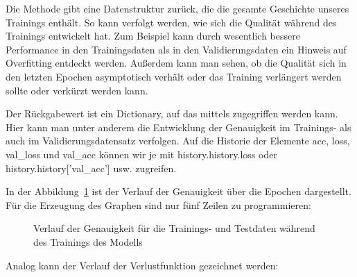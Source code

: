 Die Methode  gibt eine Datenstruktur zurück, die die gesamte Geschichte unseres Trainings enthält. So kann verfolgt werden, wie sich die Qualität während des Trainings entwickelt hat. Zum Beispiel kann durch wesentlich bessere Performance in den Trainingsdaten als in den Validierungsdaten ein Hinweis auf Overfitting entdeckt werden. Außerdem kann man sehen, ob die Qualität sich in den letzten Epochen asymptotisch verhält oder das Training verlängert werden sollte oder verkürzt werden kann.

Der Rückgabewert ist ein Dictionary, auf das mittels  zugegriffen werden kann.
 Hier kann man unter anderem  die Entwicklung der Genauigkeit im Trainings- als auch im Validierungsdatensatz
verfolgen. Auf die Historie der Elemente acc, loss, val\_loss und val\_acc können wir je mit history.history.loss oder history.history['val\_acc'] usw. zugreifen.


In der Abbildung~\ref{TensorFlowIrisPlotHist1} ist der Verlauf der Genauigkeit über die Epochen dargestellt. Für die Erzeugung des Graphen sind nur fünf Zeilen zu programmieren:

\medskip




    

\medskip

\begin{figure}[H]
	\caption{Verlauf der Genauigkeit für die Trainings- und Testdaten während des Trainings des Modells}\label{TensorFlowIrisPlotHist1}
\end{figure}

Analog kann der Verlauf der  Verlustfunktion gezeichnet werden:

\medskip






